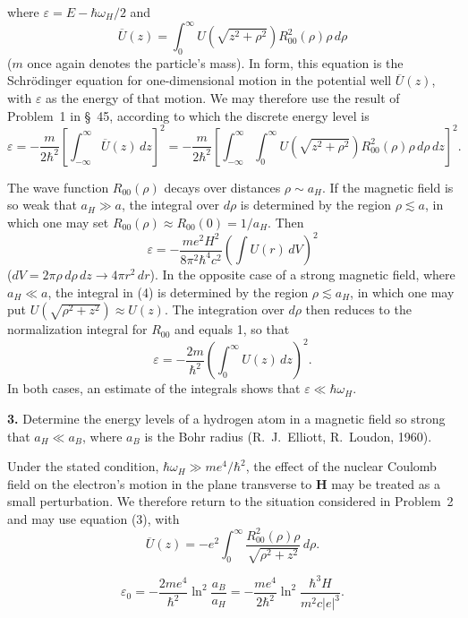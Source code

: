 where $\varepsilon=E-\hbar\omega_H/2$ and
\[
 \overline U(z)=\int_0^\infty U\left(\sqrt{z^2+\rho^2}\right)R_{00}^2(\rho)\rho\,d\rho
\]
($m$ once again denotes the particle's mass). In form, this equation is the Schrödinger equation for one-dimensional motion in the potential well $\overline U(z)$, with $\varepsilon$ as the energy of that motion. We may therefore use the result of Problem~1 in \S~45, according to which the discrete energy level is
\begin{equation}
 \varepsilon=-\frac m{2\hbar^2}\left[\int_{-\infty}^{\infty}\overline U(z)\,dz\right]^2=-\frac m{2\hbar^2}\left[\int_{-\infty}^{\infty}\int_0^\infty U\left(\sqrt{z^2+\rho^2}\right)R_{00}^2(\rho)\rho\,d\rho\,dz\right]^2.
 \tag{4}
\end{equation}

The wave function $R_{00}(\rho)$ decays over distances $\rho\sim a_H$. If the magnetic field is so weak that $a_H\gg a$, the integral over $d\rho$ is determined by the region $\rho\lesssim a$, in which one may set $R_{00}(\rho)\approx R_{00}(0)=1/a_H$. Then
\begin{equation}
 \varepsilon=-\frac{me^2H^2}{8\pi^2\hbar^4c^2}\left(\int U(r)\,dV\right)^2
 \tag{5}
\end{equation}
($dV=2\pi\rho\,d\rho\,dz\to4\pi r^2\,dr$). In the opposite case of a strong magnetic field, where $a_H\ll a$, the integral in (4) is determined by the region $\rho\lesssim a_H$, in which one may put $U(\sqrt{\rho^2+z^2})\approx U(z)$. The integration over $d\rho$ then reduces to the normalization integral for $R_{00}$ and equals 1, so that
\begin{equation}
 \varepsilon=-\frac{2m}{\hbar^2}\left(\int_0^\infty U(z)\,dz\right)^2.
 \tag{6}
\end{equation}
In both cases, an estimate of the integrals shows that $\varepsilon\ll\hbar\omega_H$.

\ProblemHeading\textbf{3.} Determine the energy levels of a hydrogen atom in a magnetic field so strong that $a_H\ll a_B$, where $a_B$ is the Bohr radius (R.~J.~Elliott, R.~Loudon, 1960).

\SolutionHeading Under the stated condition, $\hbar\omega_H\gg me^4/\hbar^2$, the effect of the nuclear Coulomb field on the electron's motion in the plane transverse to $\mathbf H$ may be treated as a small perturbation. We therefore return to the situation considered in Problem~2 and may use equation (3), with
\begin{equation}
 \overline U(z)=-e^2\int_0^\infty\frac{R_{00}^2(\rho)\rho}{\sqrt{\rho^2+z^2}}\,d\rho.
 \tag{7}
\end{equation}

\begin{equation}
 \varepsilon_0=-\frac{2me^4}{\hbar^2}\ln^2\frac{a_B}{a_H}=-\frac{me^4}{2\hbar^2}\ln^2\frac{\hbar^3H}{m^2c|e|^3}.
 \tag{8}
\end{equation}


